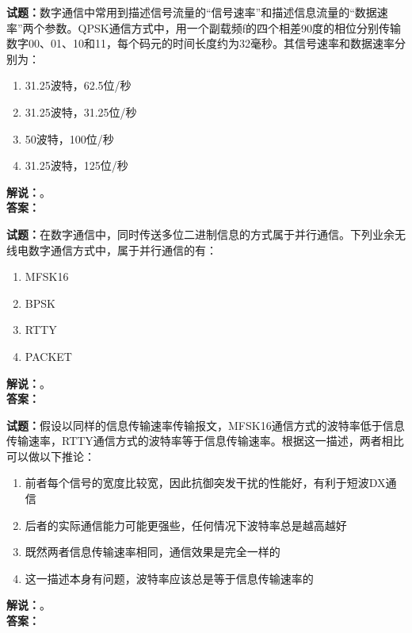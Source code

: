 \documentclass{ctexbook}
\begin{document}
\bigskip




\noindent\textbf{试题：}数字通信中常用到描述信号流量的“信号速率”和描述信息流量的“数据速率”两个参数。QPSK通信方式中，用一个副载频f的四个相差90度的相位分别传输数字00、01、10和11，每个码元的时间长度约为32毫秒。其信号速率和数据速率分别为：
\begin{enumerate}[leftmargin=3em]
\item 31.25波特，62.5位/秒
\item 31.25波特，31.25位/秒
\item 50波特，100位/秒
\item 31.25波特，125位/秒
\end{enumerate}
\noindent\textbf{解说：}\textbf{}。\\\noindent\textbf{答案：}

\bigskip




\noindent\textbf{试题：}在数字通信中，同时传送多位二进制信息的方式属于并行通信。下列业余无线电数字通信方式中，属于并行通信的有：
\begin{enumerate}[leftmargin=3em]
\item MFSK16
\item BPSK
\item RTTY
\item PACKET
\end{enumerate}
\noindent\textbf{解说：}\textbf{}。\\\noindent\textbf{答案：}

\bigskip




\noindent\textbf{试题：}假设以同样的信息传输速率传输报文，MFSK16通信方式的波特率低于信息传输速率，RTTY通信方式的波特率等于信息传输速率。根据这一描述，两者相比可以做以下推论：
\begin{enumerate}[leftmargin=3em]
\item 前者每个信号的宽度比较宽，因此抗御突发干扰的性能好，有利于短波DX通信
\item 后者的实际通信能力可能更强些，任何情况下波特率总是越高越好
\item 既然两者信息传输速率相同，通信效果是完全一样的
\item 这一描述本身有问题，波特率应该总是等于信息传输速率的
\end{enumerate}
\noindent\textbf{解说：}\textbf{}。\\\noindent\textbf{答案：}

\bigskip
\end{document}
